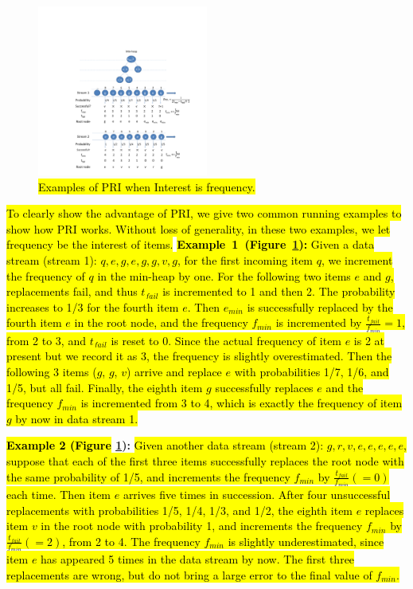 %
\begin{figure}[htbp]
	\centering
	\prefig
	\includegraphics[width=0.5\textwidth]{GraphPPT/example_freq}
	\prefigcaption \vvv\vvv
	\caption{\hl{Examples of PRI when Interest is frequency.}
    }
	\label{draw:freq}
	\postfig \vvv\vvv
\end{figure}
%

\hl{
To clearly show the advantage of PRI, we give two common running examples to show how PRI works. 
Without loss of generality, in these two examples, we let frequency be the interest of items.}
%
\hl{
\mbox{\noindent\textbf{Example 1 (Figure~\ref{draw:freq}):}}
Given a data stream (stream 1): $q,e,g,e,g,g,v,g$, for the first incoming item $q$, we increment the frequency of $q$ in the min-heap by one.
For the following two items $e$ and $g$, replacements fail, and thus $t_{fail}$ is incremented to 1 and then 2. 
The probability increases to 1/3 for the fourth item $e$.
Then $e_{min}$ is successfully replaced by the fourth item $e$ in the root node, and the frequency $f_{min}$ is incremented by $\frac{t_{fail}}{f_{min}}=1$, from 2 to 3, and  $t_{fail}$ is reset to 0.
Since the actual frequency of item $e$ is 2 at present but we record it as 3, the frequency is slightly overestimated.
Then the following 3 items ($g$, $g$, $v$) arrive and replace $e$ with probabilities 1/7, 1/6, and 1/5, but all fail. 
Finally, the eighth item $g$ successfully replaces $e$ and the frequency $f_{min}$ is incremented from 3 to 4, which is exactly the frequency of item $g$ by now in data stream 1. }

\noindent\textbf{\hl{Example 2 (Figure} \ref{draw:freq}):}\hl{
Given another data stream (stream 2): $g, r, v, e, e, e, e, e$, suppose that each of the first three items successfully replaces the root node with the same probability of 1/5, and increments the frequency $f_{min}$ by $\frac{t_{fail}}{f_{min}}(=0)$ each time. 
%
Then item $e$ arrives five times in succession. 
After four unsuccessful replacements with probabilities 1/5, 1/4, 1/3, and 1/2, the eighth item $e$ replaces item $v$ in the root node with probability 1, and increments the frequency $f_{min}$ by $\frac{t_{fail}}{f_{min}}(=2)$, from 2 to 4. 
The frequency $f_{min}$ is slightly underestimated, since item $e$ has appeared 5 times in the data stream by now. 
The first three replacements are wrong, but do not bring a large error to the final value of $f_{min}$. }


